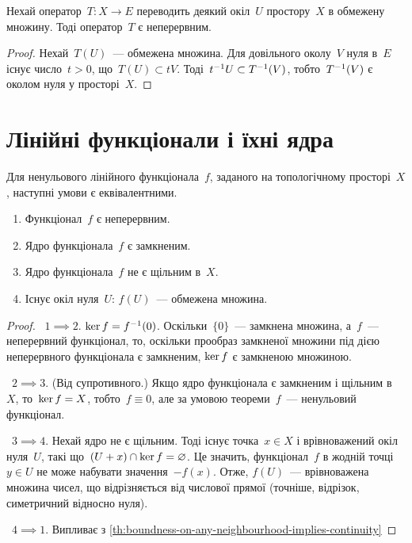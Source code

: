 \begin{theorem}
    \label{th:boundness-on-any-neighbourhood-implies-continuity}
    Нехай оператор~$T: X \to E$ переводить деякий окіл~$U$ простору~$X$ в обмежену множину. Тоді оператор~$T$ є неперервним.
\end{theorem}

\begin{proof}
    Нехай~$T(U)$~--- обмежена множина. Для довільного околу~$V$ нуля в~$E$ існує число~$t > 0$, що~$T(U) \subset t V$. Тоді~$t^{-1} U \subset T^{-1}(V)$, тобто~$T^{-1}(V)$ є околом нуля у просторі~$X$.
\end{proof}

\section{Лінійні функціонали і їхні ядра}

\begin{theorem}
    \label{th:linear-functional-continuity-equivalent-conditions}
    Для ненульового лінійного функціонала~$f$, заданого на топологічному просторі~$X$, наступні умови є еквівалентними.
    \begin{enumerate}
        \item Функціонал~$f$ є неперервним.
        \item Ядро функціонала~$f$ є замкненим.
        \item Ядро функціонала~$f$ не є щільним в~$X$.
        \item Існує окіл нуля~$U$: $f(U)$~--- обмежена множина.
    \end{enumerate}
\end{theorem}

\begin{proof}
   ~$1 \implies 2$. $\operatorname{ker} f = f^{-1}(0)$. Оскільки~$\{0\}$~--- замкнена множина, а~$f$~--- неперервний функціонал, то, оскільки прообраз замкненої множини під дією неперервного функціонала є замкненим, $\operatorname{ker} f$ є замкненою множиною.

   ~$2 \implies 3$. (Від супротивного.) Якщо ядро функціонала є замкненим і щільним в~$X$, то~$\operatorname{ker} f = X$, тобто~$f \equiv 0$, але за умовою теореми~$f$~--- ненульовий функціонал.

   ~$3 \implies 4$. Нехай ядро не є щільним. Тоді існує точка~$x \in X$ і врівноважений окіл нуля~$U$, такі що~$(U + x) \cap \operatorname{ker} f = \varnothing$. Це значить, функціонал~$f$ в жодній точці~$y \in U$ не може набувати значення~$-f(x)$. Отже, $f(U)$~--- врівноважена множина чисел, що відрізняється від числової прямої (точніше, відрізок, симетричний відносно нуля).

   ~$4 \implies 1$. Випливає з \cref{th:boundness-on-any-neighbourhood-implies-continuity}
\end{proof}


